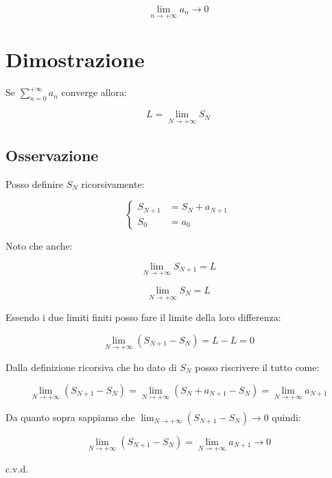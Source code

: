 \documentclass[../dimostrazioni]{subfiles}
\begin{document}
                \[  \lim_{n \to +\infty} a_n \rightarrow 0  \]

        \section*{Dimostrazione}

            Se \(\sum_{n=0}^{+\infty} a_n \) converge allora:

            \[  L = \lim_{N \to +\infty} S_N   \]

            \subsection*{Osservazione}

                Posso definire \(S_N\) ricorsivamente:

                \[  
                    \left\{
                        \begin{aligned}
                            S_{N+1} &= S_N + a_{N+1}\\
                            S_0 &= a_0
                        \end{aligned}
                    \right.
                \]

            Noto che anche:

            \[  \lim_{N \to +\infty} S_{N+1} = L \]

            \[  \lim_{N \to +\infty} S_{N} = L \]
            
            Essendo i due limiti finiti posso fare il limite della loro differenza:

            \[  \lim_{N \to +\infty}\left(S_{N+1} - S_N \right) = L - L = 0  \]

            Dalla definizione ricorsiva che ho dato di \(S_N\) posso riscrivere il tutto come:

            \[  \lim_{N \to +\infty}\left(S_{N+1} - S_N \right) = \lim_{N \to +\infty} \left(S_N + a_{N+1} - S_N \right) = \lim_{N \to +\infty} a_{N+1} \]

            Da quanto sopra sappiamo che \(  \lim_{N \to +\infty}\left(S_{N+1} - S_N \right) \rightarrow 0  \) quindi:

            \[  \lim_{N \to +\infty}\left(S_{N+1} - S_N \right) = \lim_{N \to +\infty} a_{N+1} \rightarrow 0 \]

            c.v.d.
\end{document}

